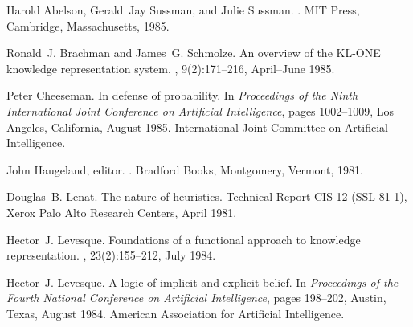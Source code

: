 %
%
\begin{thebibliography}{}

Harold Abelson, Gerald~Jay Sussman, and Julie Sussman.
.
\newblock MIT Press, Cambridge, Massachusetts, 1985.

Ronald~J. Brachman and James~G. Schmolze.
\newblock An overview of the {KL-ONE} knowledge representation system.
, 9(2):171--216, April--June 1985.

Peter Cheeseman.
\newblock In defense of probability.
\newblock In {\em Proceedings of the Ninth International Joint Conference on
  Artificial Intelligence}, pages 1002--1009, Los Angeles, California, August
  1985. International Joint Committee on Artificial Intelligence.

John Haugeland, editor.
.
\newblock Bradford Books, Montgomery, Vermont, 1981.

Douglas~B. Lenat.
\newblock The nature of heuristics.
\newblock Technical Report CIS-12 (SSL-81-1), Xerox Palo Alto Research Centers,
  April 1981.

Hector~J. Levesque.
\newblock Foundations of a functional approach to knowledge representation.
, 23(2):155--212, July 1984.

Hector~J. Levesque.
\newblock A logic of implicit and explicit belief.
\newblock In {\em Proceedings of the Fourth National Conference on Artificial
  Intelligence}, pages 198--202, Austin, Texas, August 1984. American
  Association for Artificial Intelligence.

\end{thebibliography}






